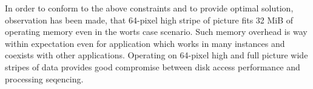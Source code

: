 In order to conform to the above constraints and to provide optimal solution, observation has been made, that 64-pixel high stripe of picture fits 32 MiB of operating memory even in the worts case scenario. Such memory overhead is way within expectation even for application which works in many instances and coexists with other applications. Operating on 64-pixel high and full picture wide stripes of data provides good compromise between disk access performance and processing seqencing.
